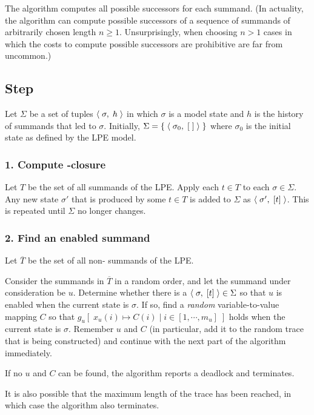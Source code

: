 The algorithm computes all possible successors for each summand.
(In actuality, the algorithm can compute possible successors of a sequence of summands of arbitrarily chosen length $n \geq 1$.
Unsurprisingly, when choosing $n > 1$ cases in which the costs to compute possible successors are prohibitive are far from uncommon.)

\subsection{Step}

Let $\Sigma$ be a set of tuples $\langle\;\sigma,\;h\;\rangle$ in which $\sigma$ is a model state and $h$ is the history of summands that led to $\sigma$.
Initially, $\Sigma = \{\;\langle\;\sigma_0,\;[\;]\;\rangle\;\}$ where $\sigma_0$ is the initial state as defined by the LPE model.

\subsubsection{1. Compute \istep{}-closure}

Let $T$ be the set of all \istep{} summands of the LPE.
Apply each $t \in T$ to each $\sigma \in \Sigma$.
Any new state $\sigma'$ that is produced by some $t \in T$ is added to $\Sigma$ as $\langle\;\sigma',\;[t]\;\rangle$.
This is repeated until $\Sigma$ no longer changes.

\subsubsection{2. Find an enabled summand}

Let $\overline{T}$ be the set of all non-\istep{} summands of the LPE.

Consider the summands in $\overline{T}$ in a random order, and let the summand under consideration be $u$.
Determine whether there is a $\langle\;\sigma,\;[t]\;\rangle \in \Sigma$ so that $u$ is enabled when the current state is $\sigma$.
If so, find a \emph{random} variable-to-value mapping $C$ so that $g_u[\; x_u(i) \mapsto C(i) \;|\; i \in [1,\cdots{},m_u] \;]$ holds when the current state is $\sigma$.
Remember $u$ and $C$ (in particular, add it to the random trace that is being constructed) and continue with the next part of the algorithm immediately.

If no $u$ and $C$ can be found, the algorithm reports a deadlock and terminates.

It is also possible that the maximum length of the trace has been reached, in which case the algorithm also terminates.

